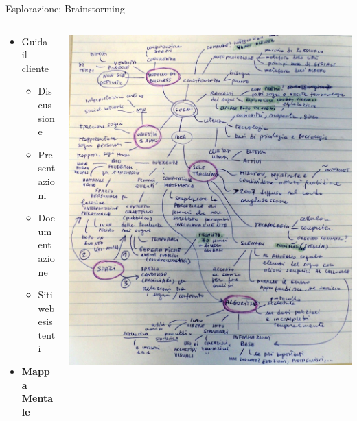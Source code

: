 \documentclass[compress, red, 14pt]{beamer}
\begin{document}
	\begin{frame}{Esplorazione: Brainstorming}		
		\begin{columns}[T]
		    \begin{column}{.5\textwidth}
				\begin{itemize}
					\item Guida il cliente
					\begin{itemize}
						\item Discussione
						\item Presentazioni
						\item Documentazione
						\item Siti web esistenti
					\end{itemize}
				\end{itemize}	

				\begin{itemize}
					\item \textbf{Mappa Mentale}
				\end{itemize}
		    \end{column}
		    \begin{column}{.5\textwidth}
				\hspace*{-0.4cm}
			    \includegraphics[scale=0.18]{images/mindmap.png}
		    \end{column}
		 \end{columns}
	\end{frame}
\end{document}
